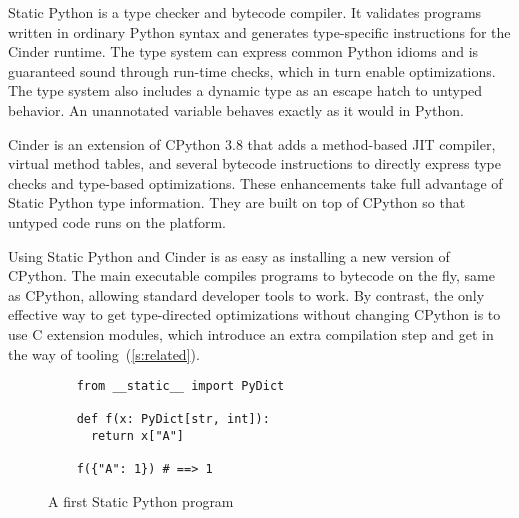 \documentclass[english,cleveref,submission]{programming}
\newcommand{\SP}{Static Python}
\begin{document}

\SP{} is a type checker and bytecode compiler.
It validates programs written in ordinary Python syntax
and generates type-specific instructions for the Cinder runtime.
The type system can express common Python idioms and is guaranteed
sound through run-time checks, which in turn enable optimizations.
The type system also includes a dynamic type as an escape hatch to
untyped behavior.
An unannotated variable behaves exactly as it would in Python.

Cinder is an extension of CPython 3.8 that adds a method-based
JIT compiler, virtual method tables, and several bytecode instructions
to directly express type checks and type-based optimizations.
These enhancements take full advantage of \SP{} type information.
They are built on top of CPython so that untyped code runs on
the platform.

Using \SP{} and Cinder is as easy as installing a new version
of CPython.
The main executable compiles programs to bytecode on the fly,
same as CPython, allowing standard developer tools to work.
By contrast, the only effective way to get type-directed optimizations
without changing CPython is to use C extension modules,
which introduce an extra compilation step and get in the way
of tooling~(\cref{s:related}).

\begin{figure}
  \begin{verbatim}
    from __static__ import PyDict

    def f(x: PyDict[str, int]):
      return x["A"]

    f({"A": 1}) # ==> 1
  \end{verbatim}
%
%
%
%
  \caption{A first \SP{} program}
  \label{fig:sp-example}
\end{figure}
\end{document}
